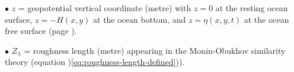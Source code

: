 \begin{trivlist}
\item[$\bullet$] $z$ = geopotential vertical coordinate (metre) with $z=0$ at the
  resting ocean surface, $z=-H(x,y)$ at the ocean bottom, and
  $z=\eta(x,y,t)$ at the ocean free surface (page
  \pageref{geopotential_defined}).

\item[$\bullet$] $Z_{\lambda}$ = roughness length (metre) appearing in
  the Monin-Obukhov similarity theory (equation
  )\ref{eq:roughness-length-defined})).

\end{trivlist}  




